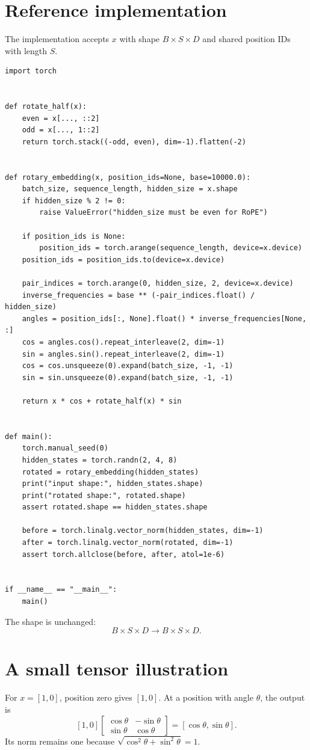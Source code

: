 \documentclass[11pt]{article}
\begin{document}
\section{Reference implementation}
The implementation accepts $x$ with shape $B\times S\times D$ and shared
position IDs with length $S$.

\begin{lstlisting}
import torch


def rotate_half(x):
    even = x[..., ::2]
    odd = x[..., 1::2]
    return torch.stack((-odd, even), dim=-1).flatten(-2)


def rotary_embedding(x, position_ids=None, base=10000.0):
    batch_size, sequence_length, hidden_size = x.shape
    if hidden_size % 2 != 0:
        raise ValueError("hidden_size must be even for RoPE")

    if position_ids is None:
        position_ids = torch.arange(sequence_length, device=x.device)
    position_ids = position_ids.to(device=x.device)

    pair_indices = torch.arange(0, hidden_size, 2, device=x.device)
    inverse_frequencies = base ** (-pair_indices.float() / hidden_size)
    angles = position_ids[:, None].float() * inverse_frequencies[None, :]
    cos = angles.cos().repeat_interleave(2, dim=-1)
    sin = angles.sin().repeat_interleave(2, dim=-1)
    cos = cos.unsqueeze(0).expand(batch_size, -1, -1)
    sin = sin.unsqueeze(0).expand(batch_size, -1, -1)

    return x * cos + rotate_half(x) * sin


def main():
    torch.manual_seed(0)
    hidden_states = torch.randn(2, 4, 8)
    rotated = rotary_embedding(hidden_states)
    print("input shape:", hidden_states.shape)
    print("rotated shape:", rotated.shape)
    assert rotated.shape == hidden_states.shape

    before = torch.linalg.vector_norm(hidden_states, dim=-1)
    after = torch.linalg.vector_norm(rotated, dim=-1)
    assert torch.allclose(before, after, atol=1e-6)


if __name__ == "__main__":
    main()
\end{lstlisting}

The shape is unchanged:
\[
B\times S\times D\longrightarrow B\times S\times D.
\]

\section{A small tensor illustration}
For $x=[1,0]$, position zero gives $[1,0]$. At a position with angle
$\theta$, the output is
\[
[1,0]\begin{bmatrix}\cos\theta&-\sin\theta\\
\sin\theta&\cos\theta\end{bmatrix}
=[\cos\theta,\sin\theta].
\]
Its norm remains one because
$\sqrt{\cos^2\theta+\sin^2\theta}=1$.
\end{document}
